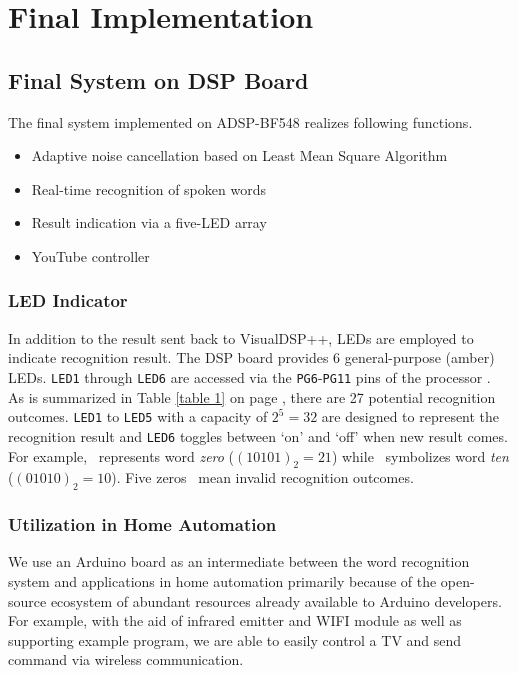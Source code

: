 \chapter{Final Implementation}
\label{chapter:implementation}


\section{Final System on DSP Board}
The final system implemented on ADSP-BF548 realizes following functions.
\begin{itemize}
\item Adaptive noise cancellation based on Least Mean Square Algorithm
\item Real-time recognition of spoken words
\item Result indication via a five-LED array
\item YouTube controller
\end{itemize}

\subsection{LED Indicator}
In addition to the result sent back to VisualDSP++, LEDs are employed to indicate recognition result. The DSP board provides 6 general-purpose (\textcolor{orange_html}{amber}) LEDs. \texttt{LED1} through \texttt{LED6} are accessed via the \texttt{PG6}-\texttt{PG11} pins of the processor \cite{bf548-manual}.\\

As is summarized in Table \ref{table 1} on page \pageref{table 1}, there are 27 potential recognition outcomes. \texttt{LED1} to \texttt{LED5} with a capacity of $2^5 = 32$ are designed to represent the recognition result and \texttt{LED6} toggles between `on' and `off' when new result comes. For example, \LED\onLED\offLED\onLED\offLED\onLED\ represents word \textit{zero} ($(10101)_2 = 21$) while \LED\offLED\onLED\offLED\onLED\offLED\ symbolizes word \textit{ten} ($(01010)_2 = 10$). Five zeros \LED\offLED\offLED\offLED\offLED\offLED\ mean invalid recognition outcomes.

\subsection{Utilization in Home Automation}
We use an Arduino\textsuperscript{\textregistered} board as an intermediate between the word recognition system and applications in home automation primarily because of the open-source ecosystem of abundant resources already available to Arduino developers. For example, with the aid of infrared emitter and WIFI module as well as supporting example program, we are able to easily control a TV and send command via wireless communication.

